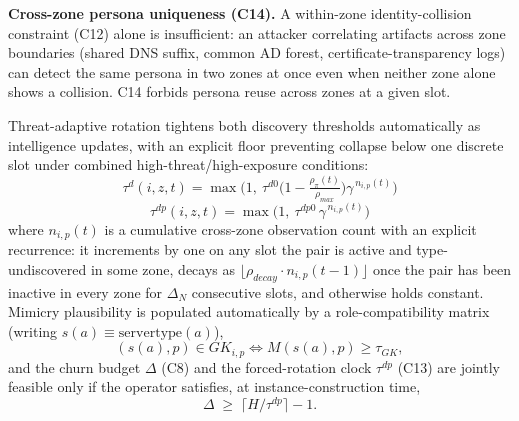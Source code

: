 \documentclass[10pt,twocolumn]{article}
\begin{document}
\textbf{Cross-zone persona uniqueness (C14).} A within-zone identity-collision constraint (C12) alone is insufficient: an attacker correlating artifacts across zone boundaries (shared DNS suffix, common AD forest, certificate-transparency logs) can detect the same persona in two zones at once even when neither zone alone shows a collision. C14 forbids persona reuse across zones at a given slot.

Threat-adaptive rotation tightens both discovery thresholds automatically as intelligence updates, with an explicit floor preventing collapse below one discrete slot under combined high-threat/high-exposure conditions:
\begin{equation}
\tau^{d}(i,z,t)=\max\!\Big(1,\ \tau^{d0}\Big(1-\tfrac{\rho_\pi(t)}{\rho_{max}}\Big)\gamma^{\,n_{i,p}(t)}\Big)
\end{equation}
\begin{equation}
\tau^{dp}(i,z,t)=\max\!\Big(1,\ \tau^{dp0}\,\gamma^{\,n_{i,p}(t)}\Big)
\end{equation}
where $n_{i,p}(t)$ is a cumulative cross-zone observation count with an explicit recurrence: it increments by one on any slot the pair is active and type-undiscovered in some zone, decays as $\lfloor\rho_{decay}\cdot n_{i,p}(t-1)\rfloor$ once the pair has been inactive in every zone for $\Delta_N$ consecutive slots, and otherwise holds constant. Mimicry plausibility is populated automatically by a role-compatibility matrix (writing $s(a)\equiv\mathrm{servertype}(a)$),
\begin{equation}
(s(a),p)\in GK_{i,p} \iff M(s(a),p)\geq \tau_{GK},
\end{equation}
and the churn budget $\Delta$ (C8) and the forced-rotation clock $\tau^{dp}$ (C13) are jointly feasible only if the operator satisfies, at instance-construction time,
\begin{equation}
\Delta \;\geq\; \lceil H/\tau^{dp}\rceil - 1.
\end{equation}
\end{document}
